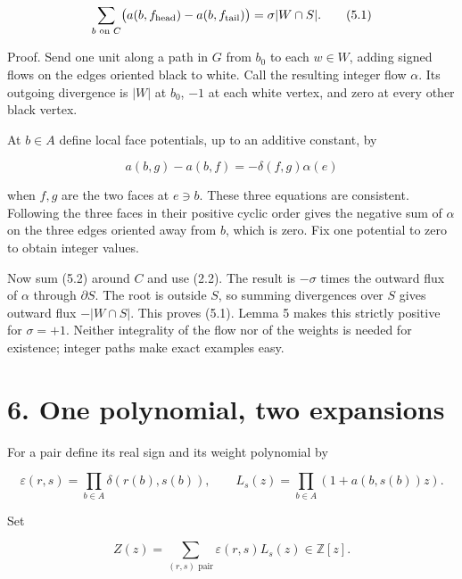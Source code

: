 \documentclass[a4paper,11pt]{amsart}
\begin{document}
\begin{equation*}
\sum_{b\text{ on }C}\bigl(a(b,f_{\rm head})-a(b,f_{\rm tail})\bigr)
=\sigma|W\cap S|.                                                \tag{5.1}
\end{equation*}

Proof. Send one unit along a path in $G$ from $b_0$ to each $w\in W$, adding signed flows on the edges oriented black to white. Call the resulting integer flow $\alpha$. Its outgoing divergence is $|W|$ at $b_0$, $-1$ at each white vertex, and zero at every other black vertex.

At $b\in A$ define local face potentials, up to an additive constant, by

\begin{equation*}
a(b,g)-a(b,f)=-\delta(f,g)\alpha(e)                               \tag{5.2}
\end{equation*}

when $f,\allowbreak g$ are the two faces at $e\ni b$. These three equations are consistent. Following the three faces in their positive cyclic order gives the negative sum of $\alpha$ on the three edges oriented away from $b$, which is zero. Fix one potential to zero to obtain integer values.

Now sum (5.2) around $C$ and use (2.2). The result is $-\sigma$ times the outward flux of $\alpha$ through $\partial S$. The root is outside $S$, so summing divergences over $S$ gives outward flux $-|W\cap S|$. This proves (5.1). Lemma 5 makes this strictly positive for $\sigma=+1$. Neither integrality of the flow nor of the weights is needed for existence; integer paths make exact examples easy.

\section*{6. One polynomial, two expansions}

For a pair define its real sign and its weight polynomial by

\begin{equation*}
\varepsilon(r,s)=\prod_{b\in A}\delta(r(b),s(b)),\qquad
L_s(z)=\prod_{b\in A}(1+a(b,s(b))z).
\end{equation*}

Set

\begin{equation*}
Z(z)=\sum_{(r,s)\text{ pair}}\varepsilon(r,s)L_s(z)\in\mathbb Z[z].           \tag{6.1}
\end{equation*}
\end{document}
